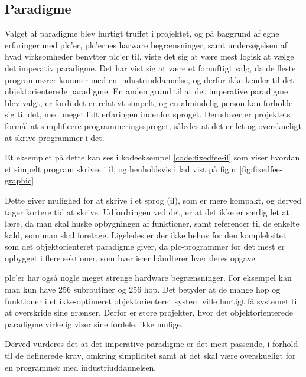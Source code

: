 \subsection*{Paradigme}
Valget af paradigme blev hurtigt truffet i projektet, og på baggrund af egne erfaringer med \gls{plc}'er, \gls{plc}'ernes harware begrænsninger, samt undersøgelsen af hvad virksomheder benytter \gls{plc}'er til, viste det sig at være mest logisk at vælge det imperativ paradigme.
Det har vist sig at være et fornuftigt valg, da de fleste programmører kommer med en industriuddannelse, og derfor ikke kender til det objektorienterede paradigme.
En anden grund til at det imperative paradigme blev valgt, er fordi det er relativt simpelt, og en almindelig person kan forholde sig til det, med meget lidt erfaringen indenfor sproget. 
Derudover er projektets formål at simplificere programmeringssproget, således at det er let og overskueligt at skrive programmer i det.

Et eksemplet på dette kan ses i kodeeksempel \ref{code:fixedfee-il} som viser hvordan et simpelt program skrives i \gls{il}, og henholdsvis i \gls{lad} vist på figur \ref{fig:fixedfee-graphic}

Dette giver mulighed for at skrive i et sprog (\gls{il}), som er mere kompakt, og derved tager kortere tid at skrive. Udfordringen ved det, er at det ikke er særlig let at lære, da man skal huske opbygningen af funktioner, samt referencer til de enkelte kald, som man skal foretage.
Ligeledes er der ikke behov for den kompleksitet som det objektorienteret paradigme giver, da \gls{plc}-programmer for det mest er opbygget i flere sektioner, som hver især håndterer hver deres opgave.

\Gls{plc}'er har også nogle meget strenge hardware begrænsninger. For eksempel kan man kun have 256 subroutiner og 256 hop. Det betyder at de mange hop og funktioner i et ikke-optimeret objektorienteret system ville hurtigt få systemet til at overskride sine grænser. Derfor er store projekter, hvor det objektorienterede paradigme virkelig viser sine fordele, ikke mulige.

Derved vurderes det at det imperative paradigme er det mest passende, i forhold til de definerede krav, omkring simplicitet samt at det skal være overskueligt for en programmør med industriuddannelsen.

